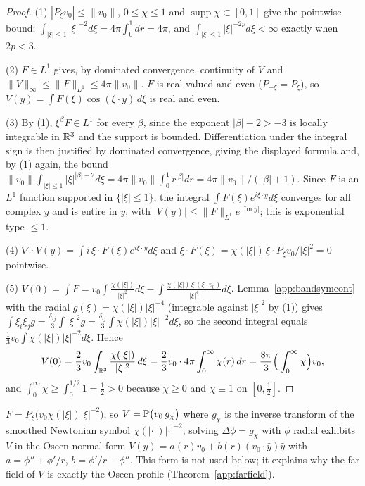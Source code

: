 \begin{proof}
(1) $|P_\xi v_0|\le\|v_0\|$, $0\le\chi\le1$ and
$\operatorname{supp}\chi\subset[0,1]$ give the pointwise bound;
$\int_{|\xi|\le1}|\xi|^{-2}d\xi=4\pi\int_0^1dr=4\pi$, and
$\int_{|\xi|\le1}|\xi|^{-2p}d\xi<\infty$ exactly when $2p<3$.

(2) $F\in L^1$ gives, by dominated convergence, continuity of $V$ and
$\|V\|_\infty\le\|F\|_{L^1}\le4\pi\|v_0\|$. $F$ is real-valued and even
($P_{-\xi}=P_\xi$), so
$V(y)=\int F(\xi)\cos(\xi\cdot y)\,d\xi$ is real and even.

(3) By (1), $\xi^\beta F\in L^1$ for every $\beta$, since the exponent
$|\beta|-2>-3$ is locally integrable in $\mathbb R^3$ and the support is
bounded. Differentiation under the integral sign is then justified by
dominated convergence, giving the displayed formula and, by (1) again,
the bound
$\|v_0\|\int_{|\xi|\le1}|\xi|^{|\beta|-2}d\xi
=4\pi\|v_0\|\int_0^1r^{|\beta|}dr=4\pi\|v_0\|/(|\beta|+1)$. Since $F$
is an $L^1$ function supported in $\{|\xi|\le1\}$, the integral
$\int F(\xi)e^{i\xi\cdot y}d\xi$ converges for all complex $y$ and is
entire in $y$, with $|V(y)|\le\|F\|_{L^1}e^{|\operatorname{Im}y|}$;
this is exponential type $\le1$.

(4) $\nabla\cdot V(y)=\int i\,\xi\cdot F(\xi)e^{i\xi\cdot y}d\xi$ and
$\xi\cdot F(\xi)=\chi(|\xi|)\,\xi\cdot P_\xi v_0/|\xi|^2=0$ pointwise.

(5) $V(0)=\int F
=v_0\int\frac{\chi(|\xi|)}{|\xi|^2}d\xi
-\int\frac{\chi(|\xi|)\,\xi\,(\xi\cdot v_0)}{|\xi|^4}d\xi$.
Lemma~\ref{app:bandsymcont} with the radial
$g(\xi)=\chi(|\xi|)|\xi|^{-4}$ (integrable against $|\xi|^2$ by (1))
gives $\int\xi_i\xi_jg=\frac{\delta_{ij}}3\int|\xi|^2g
=\frac{\delta_{ij}}3\int\chi(|\xi|)|\xi|^{-2}d\xi$, so the second
integral equals $\frac13v_0\int\chi(|\xi|)|\xi|^{-2}d\xi$. Hence
\[
V(0)=\frac23v_0\int_{\mathbb R^3}\frac{\chi(|\xi|)}{|\xi|^2}\,d\xi
=\frac23v_0\cdot4\pi\int_0^\infty\chi(r)\,dr
=\frac{8\pi}{3}\Big(\int_0^\infty\chi\Big)v_0 ,
\]
and $\int_0^\infty\chi\ge\int_0^{1/2}1=\frac12>0$ because $\chi\ge0$ and
$\chi\equiv1$ on $[0,\tfrac12]$.
\end{proof}

\begin{remark}\label{app:oseenform}
$F=P_\xi\big(v_0\chi(|\xi|)|\xi|^{-2}\big)$, so
$V=\mathbb P\big(v_0\,g_\chi\big)$ where $g_\chi$ is the inverse transform of
the smoothed Newtonian symbol $\chi(|\cdot|)|\cdot|^{-2}$; solving
$\Delta\phi=g_\chi$ with $\phi$ radial exhibits $V$ in the Oseen normal
form $V(y)=a(r)v_0+b(r)(v_0\cdot\hat y)\hat y$ with
$a=\phi''+\phi'/r$, $b=\phi'/r-\phi''$. This form is not used below; it
explains why the far field of $V$ is exactly the Oseen profile
(Theorem~\ref{app:farfield}).
\end{remark}

